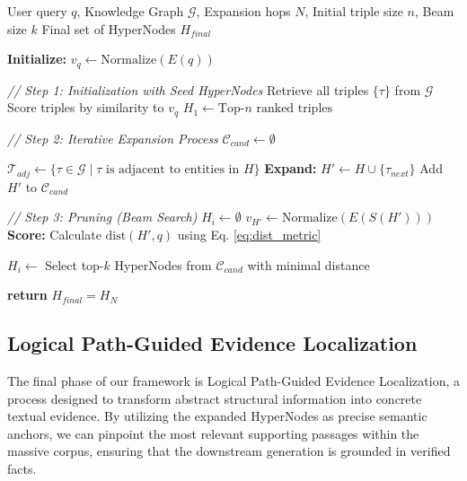 \begin{algorithm}[!tb]
\caption{Iterative HyperNode Expansion Algorithm}
\label{alg:hypernode_expansion}
\begin{algorithmic}[1]
\REQUIRE User query $q$, Knowledge Graph $\mathcal{G}$, Expansion hops $N$, Initial triple size $n$, Beam size $k$
\ENSURE Final set of HyperNodes $H_{final}$

\STATE \textbf{Initialize:} $v_q \leftarrow \text{Normalize}(E(q))$

\STATE \textit{// Step 1: Initialization with Seed HyperNodes}
\STATE Retrieve all triples $\{\tau\}$ from $\mathcal{G}$
\STATE Score triples by similarity to $v_q$
\STATE $H_1 \leftarrow \text{Top-}n \text{ ranked triples}$

\STATE \textit{// Step 2: Iterative Expansion Process}
    \STATE $\mathcal{C}_{cand} \leftarrow \emptyset$ 
    
        \STATE $\mathcal{T}_{adj} \leftarrow \{ \tau \in \mathcal{G} \mid \tau \text{ is adjacent to entities in } H \}$
            \STATE \textbf{Expand:} $H' \leftarrow H \cup \{ \tau_{next} \}$
            \STATE Add $H'$ to $\mathcal{C}_{cand}$
        \ENDFOR
    \ENDFOR
    
    \STATE \textit{// Step 3: Pruning (Beam Search)}
    \STATE $H_{i} \leftarrow \emptyset$
        \STATE  $v_{H'} \leftarrow \text{Normalize}(E(S(H')))$
        \STATE \textbf{Score:} Calculate $\text{dist}(H', q)$ using Eq. \eqref{eq:dist_metric}
    \ENDFOR
    
    \STATE $H_{i} \leftarrow$ Select top-$k$ HyperNodes from $\mathcal{C}_{cand}$ with minimal distance
\ENDFOR

\STATE \textbf{return} $H_{final} = H_{N}$
\end{algorithmic}
\vspace{-2pt}
\end{algorithm}


\subsection{Logical Path-Guided Evidence Localization}
\label{sec:evidence_localization}

The final phase of our framework is Logical Path-Guided Evidence Localization, a process designed to transform abstract structural information into concrete textual evidence. By utilizing the expanded HyperNodes as precise semantic anchors, we can pinpoint the most relevant supporting passages within the massive corpus, ensuring that the downstream generation is grounded in verified facts.

